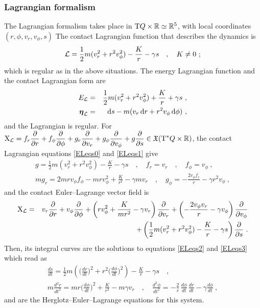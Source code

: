 \documentclass[12pt]{report}
\def\bea{\begin{eqnarray}}
\def\eea{\end{eqnarray}}
\def\beann{\begin{eqnarray*}}
\def\eeann{\end{eqnarray*}}
\def\dst{\displaystyle}
\def\derpar#1#2{\frac{\partial{#1}}{\partial{#2}}}
\def\vf{\mathfrak X}
\def\Lag{{\cal L}}
\def\d{{\rm d}}
\def\Real{\mathbb{R}}
\def\bmeta{\mbox{\boldmath $\eta$}}
\def\X{{\rm X}}
\def\Tan{{\rm T}}
\begin{document}
\subsubsection{Lagrangian formalism}

The Lagrangian formalism takes place in $\Tan Q\times\Real\simeq\Real^5$, with local coordinates 
$(r,\phi,v_r,v_\phi,s)$
The contact Lagrangian function that describes the dynamics is
$$
\Lag=\frac{1}{2}m(v_r^2+r^2v_\phi^2)-\frac{K}{r}-\gamma s \quad , \quad K\not=0 \ ;
$$
which is regular as in the above situations.
The energy Lagrangian function and the contact Lagrangian form are
\beann
E_\Lag&=&\frac{1}{2}m(v_r^2+r^2v_\phi^2)+\frac{K}{r}+\gamma s \ , \\
\bmeta_\Lag&=&\d s-m(v_r\,\d r+r^2v_\phi\,\d\phi) \ , 
\eeann
and the Lagrangian is regular.
For $\displaystyle \X_\Lag=f_r\derpar{}{r}+f_\phi\derpar{}{\phi}+
g_r\derpar{}{v_r}+g_\phi\derpar{}{v_\phi}+g\derpar{}{s}\in\vf(\Tan^*Q\times \Real)$, 
the contact Lagrangian equations \eqref{ELeqs0}
and \eqref{ELeqs1} give
\beann
g=\frac{1}{2}m(v_r^2+r^2v_\phi^2)-\frac{K}{r}-\gamma s \quad , \quad
f_r=v_r \quad , \quad f_\phi=v_\phi \ , \\ 
mg_r=2mrv_\phi f_\phi-mrv_\phi^2+\frac{K}{r^2}-\gamma mv_r \quad , \quad 
g_\phi=-\frac{2v_\phi f_r}{r}-\gamma r^2v_\phi   \ ,
\eeann
and the contact Euler--Lagrange vector field is
\beann
\X_\Lag&=&v_r\derpar{}{r}+v_\phi\derpar{}{\phi}+\left(rv_\phi^2+\dst\frac{K}{mr^2}-\gamma v_r\right)\derpar{}{v_r}
+\left(-\frac{2v_\phi v_r}{r}-\gamma v_\phi\right)\derpar{}{v_\phi} \\
& & +
\left(\frac{1}{2}m(v_r^2+r^2v_\phi^2)-\frac{K}{r}-\gamma s\right)\derpar{}{s}\ .
\eeann
Then, its integral curves are the solutions to equations \eqref{ELeqs2} and \eqref{ELeqs3} which read as
\bea
\frac{ds}{dt}=\frac{1}{2}m\left(\Big(\frac{dr}{dt}\Big)^2+r^2\Big(\frac{d\phi}{dt}\Big)^2\right)-\frac{K}{r}-\gamma s \quad , \quad
\nonumber \\
 m\frac{d^2r}{dt^2}=mr\Big(\frac{d\phi}{dt}\Big)^2+\frac{K}{r^2}-m\gamma v_r  
\quad , \quad  \frac{d^2\phi}{dt^2}=
-\frac{2}{r}\,\frac{d\phi}{dt}\,\frac{dr}{dt}-\gamma \frac{d\phi}{dt} \ ,
\label{eqEL-M}
\eea
and are the Herglotz--Euler--Lagrange equations for this system.
\end{document}

